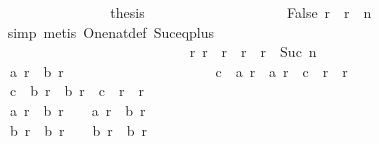 \begin{isabellebody}
\ \ \ \ \ \ \ \ \ \ \ \ \ \ \ \ \isamarkupfalse%
\isanewline
\ \ \ \ \ \ \ \ \ \ \ \ \ \ \ \ \isamarkupfalse%
\ {\isacharquery}thesis\isanewline
\ \ \ \ \ \ \ \ \ \ \ \ \ \ \ \ \ \ \isamarkupfalse%
\ False\ {\isacharbackquoteopen}r\ {\isacharequal}\ r{}\ {\isacharplus}\ n{\isacharbackquoteclose}\isanewline
\ \ \ \ \ \ \ \ \ \ \ \ \ \ \ \ \ \ \isamarkupfalse%
\ simp\ {\isacharparenleft}metis\ One{\isacharunderscore}nat{\isacharunderscore}def\ Suc{\isacharunderscore}eq{\isacharunderscore}plus{}{\isacharparenright}\isanewline
\ \ \ \ \ \ \ \ \ \ \ \ \ \ \isamarkupfalse%
\isanewline
\ \ \ \ \ \ \ \ \ \ \ \ \isamarkupfalse%
\isanewline
\ \ \ \ \ \ \ \ \ \ \isamarkupfalse%
\isanewline
\isanewline
\ \ \ \ \ \ \ \ \ \ \isamarkupfalse%
\isanewline
\isanewline
\ \ \ \ \ \ \ \ \ \ \isamarkupfalse%
\ {\isachardoublequoteopen}{\isasymforall}r{\isachardot}\ r{}\ {\isacharless}\ r\ {\isasymand}\ r\ {\isacharless}\ r{}\ {\isacharplus}\ Suc\ n\ {\isasymlongrightarrow}\isanewline
\ \ \ \ \ \ \ \ \ \ \ \ \ \ \ \ \ \ \ \ {\isacharquery}a\ r\ {\isasymnoteq}\ {\isacharquery}b\ r\ {\isasymand}\isanewline
\ \ \ \ \ \ \ \ \ \ \ \ \ \ \ \ \ \ \ \ c{}\ {\isasymle}\ {\isacharquery}a\ r\ {\isasymand}\ {\isacharquery}a\ r\ {\isasymle}\ c{}\ {\isacharplus}\ {\isacharparenleft}r\ {\isacharminus}\ r{}{\isacharparenright}\ {\isasymand}\isanewline
\ \ \ \ \ \ \ \ \ \ \ \ \ \ \ \ \ \ \ \ c{}\ {\isasymle}\ {\isacharquery}b\ r\ {\isasymand}\ {\isacharquery}b\ r\ {\isasymle}\ c{}\ {\isacharplus}\ {\isacharparenleft}r\ {\isacharminus}\ r{}{\isacharparenright}\ {\isasymand}\isanewline
\ \ \ \ \ \ \ \ \ \ \ \ \ \ \ \ \ \ \ \ {\isacharparenleft}{\isacharquery}a\ r\ {\isacharequal}\ {\isacharquery}b\ {\isacharparenleft}r\ {\isacharminus}\ {}{\isacharparenright}\ {\isasymor}\ {\isacharquery}a\ r\ {\isacharequal}\ {\isacharquery}b\ {\isacharparenleft}r\ {\isacharminus}\ {}{\isacharparenright}\ {\isacharplus}\ {}{\isacharparenright}\ {\isasymand}\isanewline
\ \ \ \ \ \ \ \ \ \ \ \ \ \ \ \ \ \ \ \ {\isacharparenleft}{\isacharquery}b\ r\ {\isacharequal}\ {\isacharquery}b\ {\isacharparenleft}r\ {\isacharminus}\ {}{\isacharparenright}\ {\isasymor}\ {\isacharquery}b\ r\ {\isacharequal}\ {\isacharquery}b\ {\isacharparenleft}r\ {\isacharminus}\ {}{\isacharparenright}\ {\isacharplus}\ {}{\isacharparenright}{\isachardoublequoteclose}\isanewline

\end{isabellebody}

